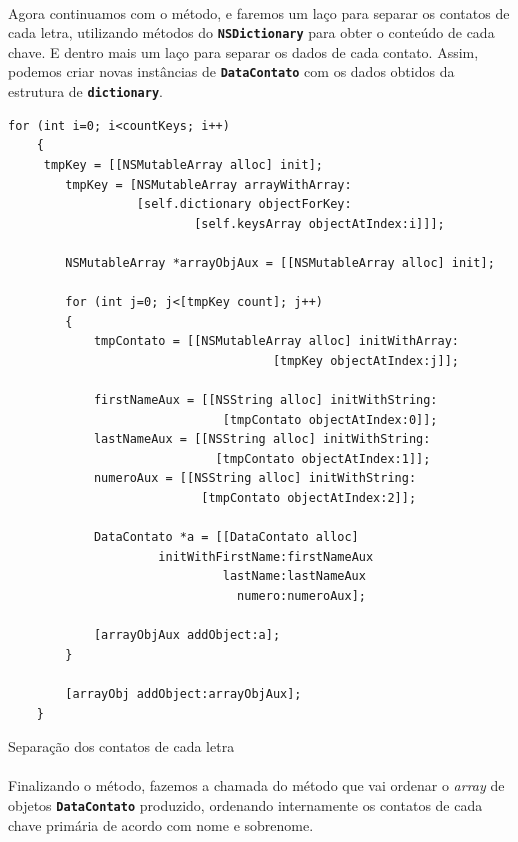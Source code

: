 \documentclass[a4paper,12pt,brazil,doubleside]{book}
\begin{document}
\begin{singlespace}
\paragraph{}Agora continuamos com o método, e faremos um laço para separar os contatos de cada letra, utilizando métodos do \texttt{\textbf{NSDictionary}} para obter o conteúdo de cada chave. E dentro mais um laço para separar os dados de cada contato. Assim, podemos criar novas instâncias de \texttt{\textbf{DataContato}} com os dados obtidos da estrutura de \texttt{\textbf{dictionary}}.

\begin{listing}[H]
\begin{verbatim}
for (int i=0; i<countKeys; i++)
    {
	 tmpKey = [[NSMutableArray alloc] init];
        tmpKey = [NSMutableArray arrayWithArray:
                  [self.dictionary objectForKey:
                          [self.keysArray objectAtIndex:i]]];
        
        NSMutableArray *arrayObjAux = [[NSMutableArray alloc] init];
        
        for (int j=0; j<[tmpKey count]; j++)
        {
            tmpContato = [[NSMutableArray alloc] initWithArray:
                                     [tmpKey objectAtIndex:j]];

            firstNameAux = [[NSString alloc] initWithString:
                              [tmpContato objectAtIndex:0]];
            lastNameAux = [[NSString alloc] initWithString:
                             [tmpContato objectAtIndex:1]];
            numeroAux = [[NSString alloc] initWithString:
                           [tmpContato objectAtIndex:2]];
            
            DataContato *a = [[DataContato alloc] 
                     initWithFirstName:firstNameAux
                              lastName:lastNameAux
                                numero:numeroAux];
            
            [arrayObjAux addObject:a];            
        }
        
        [arrayObj addObject:arrayObjAux];
    }
\end{verbatim}
\caption{Separação dos contatos de cada letra}
\end{listing}

\paragraph{}Finalizando o método, fazemos a chamada do método que vai ordenar o \emph{array} de objetos \texttt{\textbf{DataContato}} produzido, ordenando internamente os contatos de cada chave primária de acordo com nome e sobrenome.


\end{singlespace}
\end{document}
